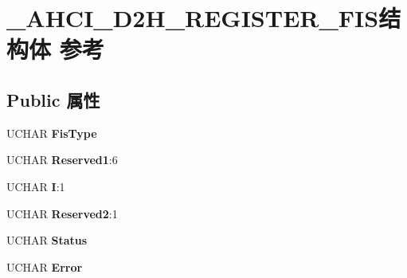 \hypertarget{struct___a_h_c_i___d2_h___r_e_g_i_s_t_e_r___f_i_s}{}\section{\+\_\+\+A\+H\+C\+I\+\_\+\+D2\+H\+\_\+\+R\+E\+G\+I\+S\+T\+E\+R\+\_\+\+F\+I\+S结构体 参考}
\label{struct___a_h_c_i___d2_h___r_e_g_i_s_t_e_r___f_i_s}
\subsection*{Public 属性}
\begin{DoxyCompactItemize}
\item 
\mbox{\label{struct___a_h_c_i___d2_h___r_e_g_i_s_t_e_r___f_i_s_a373ce618225a83b3caa932bae84f97a2}} 
U\+C\+H\+AR {\bfseries Fis\+Type}
\item 
\mbox{\label{struct___a_h_c_i___d2_h___r_e_g_i_s_t_e_r___f_i_s_a59b0846bb32f7c207a6de3591c0abeed}} 
U\+C\+H\+AR {\bfseries Reserved1}\+:6
\item 
\mbox{\label{struct___a_h_c_i___d2_h___r_e_g_i_s_t_e_r___f_i_s_acb7874d0c62990e2fb4df52a80a38bba}} 
U\+C\+H\+AR {\bfseries I}\+:1
\item 
\mbox{\label{struct___a_h_c_i___d2_h___r_e_g_i_s_t_e_r___f_i_s_ab878f96ff2c59803c687e18e957af5f8}} 
U\+C\+H\+AR {\bfseries Reserved2}\+:1
\item 
\mbox{\label{struct___a_h_c_i___d2_h___r_e_g_i_s_t_e_r___f_i_s_a70d6603ff1da3d2edb5e4ceba1cdd9f0}} 
U\+C\+H\+AR {\bfseries Status}
\item 
\mbox{\label{struct___a_h_c_i___d2_h___r_e_g_i_s_t_e_r___f_i_s_ad610bf1b87d8a997e8b00fc089271ab2}} 
U\+C\+H\+AR {\bfseries Error}
\item 
\mbox{\label{struct___a_h_c_i___d2_h___r_e_g_i_s_t_e_r___f_i_s_a9a2576bc76e4507571921151f9492b4a}} 

\end{DoxyCompactItemize}
